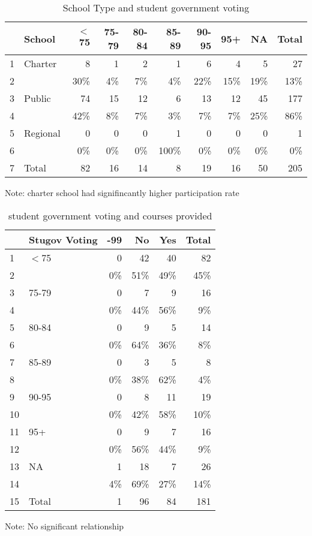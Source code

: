 \documentclass[12pt]{article}
\begin{document}
\begin{table}[ht]
\caption{School Type and student government voting} 
\centering
\begin{tabular}{llrrrrrrrr}
  \hline
 & School & $<$75 & 75-79 & 80-84 & 85-89 & 90-95 & 95+ & NA & Total \\ 
  \hline
1 & Charter & 8 & 1 & 2 & 1 & 6 & 4 & 5 & 27 \\ 
  2 &   & 30\% & 4\% & 7\% & 4\% & 22\% & 15\% & 19\% & 13\% \\ 
  3 & Public & 74 & 15 & 12 & 6 & 13 & 12 & 45 & 177 \\ 
  4 &   & 42\% & 8\% & 7\% & 3\% & 7\% & 7\% & 25\% & 86\% \\ 
  5 & Regional & 0 & 0 & 0 & 1 & 0 & 0 & 0 & 1 \\ 
  6 &   & 0\% & 0\% & 0\% & 100\% & 0\% & 0\% & 0\% & 0\% \\ 
  7 & Total & 82 & 16 & 14 & 8 & 19 & 16 & 50 & 205 \\ 
   \hline
\end{tabular}
\begin{tablenotes}
      \small
      \item Note: charter school had signifincantly higher participation rate
    \end{tablenotes}
\end{table}


\begin{table}[ht]
\caption{student government voting and courses provided} 
\centering
\begin{tabular}{llrrrr}
  \hline
 & Stugov Voting & -99 & No & Yes & Total \\ 
  \hline
1 & $<$75 & 0 & 42 & 40 & 82 \\ 
  2 &   & 0\% & 51\% & 49\% & 45\% \\ 
  3 & 75-79 & 0 & 7 & 9 & 16 \\ 
  4 &   & 0\% & 44\% & 56\% & 9\% \\ 
  5 & 80-84 & 0 & 9 & 5 & 14 \\ 
  6 &   & 0\% & 64\% & 36\% & 8\% \\ 
  7 & 85-89 & 0 & 3 & 5 & 8 \\ 
  8 &   & 0\% & 38\% & 62\% & 4\% \\ 
  9 & 90-95 & 0 & 8 & 11 & 19 \\ 
  10 &   & 0\% & 42\% & 58\% & 10\% \\ 
  11 & 95+ & 0 & 9 & 7 & 16 \\ 
  12 &   & 0\% & 56\% & 44\% & 9\% \\ 
  13 & NA & 1 & 18 & 7 & 26 \\ 
  14 &   & 4\% & 69\% & 27\% & 14\% \\ 
  15 & Total & 1 & 96 & 84 & 181 \\ 
   \hline
\end{tabular}
\begin{tablenotes}
      \small
      \item Note: No significant relationship
    \end{tablenotes}
\end{table}
\end{document}
